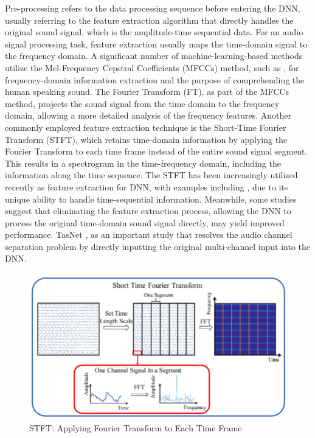 Pre-processing refers to the data processing sequence before entering the DNN, usually referring to the feature extraction algorithm that directly handles the original sound signal, which is the amplitude-time sequential data. For an audio signal processing task, feature extraction usually maps the time-domain signal to the frequency domain. A significant number of machine-learning-based methods utilize the Mel-Frequency Cepstral Coefficients (MFCCs) method, such as \cite{di_applicability_2023} \cite{nsalo_kong_underwater_2024} \cite{palaniappan_comparative_2014} \cite{wang_research_2024}, for frequency-domain information extraction and the purpose of comprehending the human speaking sound. The Fourier Transform (FT), as part of the MFCCs method, projects the sound signal from the time domain to the frequency domain, allowing a more detailed analysis of the frequency features. Another commonly employed feature extraction technique is the Short-Time Fourier Transform (STFT), which retains time-domain information by applying the Fourier Transform to each time frame instead of the entire sound signal segment. This results in a spectrogram in the time-frequency domain, including the information along the time sequence. The STFT has been increasingly utilized recently as feature extraction for DNN, with examples including \cite{tan_sound_2021} 
\cite{chakrabarty_multi-speaker_2019} \cite{pujol_beamlearning_2021} \cite{schymura_pilot_2021} \cite{niu_deep-learning_2019} \cite{liu_rolling_2016}, due to its unique ability to handle time-sequential information. Meanwhile, some studies suggest that eliminating the feature extraction process, allowing the DNN to process the original time-domain sound signal directly, may yield improved performance. TasNet \cite{luo_tasnet_2018}, as an important study that resolves the audio channel separation problem by directly inputting the original multi-channel input into the DNN.

\begin{figure}[h]
    \centering
    \includegraphics[width=0.75\linewidth]{figures/STFT_Explain.png}
    \caption{STFT: Applying Fourier Transform to Each Time Frame}
\end{figure}

